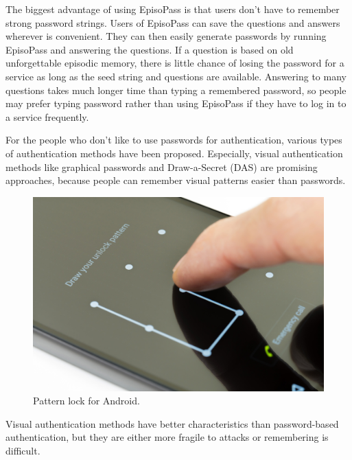 \documentclass[sigconf]{acmart}
\begin{document}
The biggest advantage of using EpisoPass is that
users don't have to remember strong password strings.
%
Users of EpisoPass can save the questions and answers
wherever is convenient. They can
then easily generate passwords by running
EpisoPass and answering the questions.
%
If a question is based on old unforgettable episodic memory,
there is little chance of losing the password for a service
as long as the seed string and questions are available.
%
Answering to many questions takes much longer time than typing a
remembered password, so people may prefer typing password
rather than using EpisoPass if they have to log in to a service frequently.


For the people who don't like to use passwords for authentication,
various types of authentication methods have been proposed.
Especially, visual authentication methods
like graphical passwords\cite{Biddle:2012:GPL:2333112.2333114,GraphicalPasswords}
and Draw-a-Secret (DAS) \cite{Jermyn:1999:DAG:1251421.1251422} are promising approaches, because
people can remember visual patterns easier than passwords.


\begin{figure}
  \includegraphics[width=12cm,bb=0 0 1000 667]{figures/AndroidLock.jpg}
  \caption{Pattern lock for Android.}
  \label{AndroidLock}
\end{figure}

Visual authentication methods have better characteristics than
password-based authentication, but
they are either more fragile to attacks
or remembering is difficult.
\end{document}

